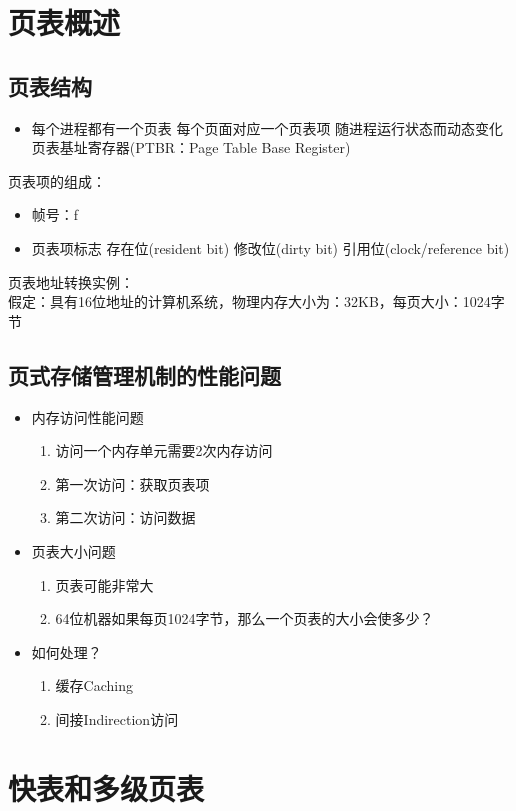 \section{页表概述}
\subsection{页表结构}
\begin{itemize}
	\item 每个进程都有一个页表
	\subitem 每个页面对应一个页表项
	\subitem 随进程运行状态而动态变化
	\subitem 页表基址寄存器(PTBR：Page Table Base Register)
\end{itemize}
页表项的组成：
\begin{itemize}
	\item 帧号：f
	\item 页表项标志
	\subitem 存在位(resident bit)
	\subitem 修改位(dirty bit)
	\subitem 引用位(clock/reference bit)
\end{itemize}
页表地址转换实例：\\
假定：具有16位地址的计算机系统，物理内存大小为：32KB，每页大小：1024字节
\subsection{页式存储管理机制的性能问题}
\begin{itemize}
	\item 内存访问性能问题
	\begin{enumerate}
		\item 访问一个内存单元需要2次内存访问
		\item 第一次访问：获取页表项
		\item 第二次访问：访问数据
	\end{enumerate}
\item 页表大小问题
\begin{enumerate}
	\item 页表可能非常大
	\item 64位机器如果每页1024字节，那么一个页表的大小会使多少？
\end{enumerate}
\item 如何处理？
\begin{enumerate}
	\item 缓存Caching
	\item 间接Indirection访问
\end{enumerate}
\end{itemize}
\section{快表和多级页表}
